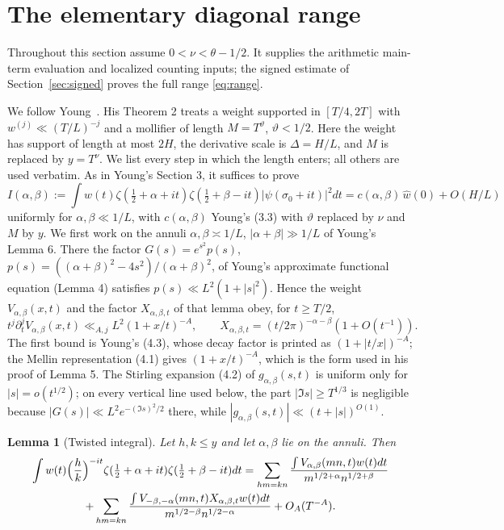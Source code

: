 \documentclass[11pt]{article}
\newtheorem{lemma}[theorem]{Lemma}
\theoremstyle{remark}
\newcommand{\wh}{\widehat w(0)}
\begin{document}
\section{The elementary diagonal range}\label{sec:moment}

Throughout this section assume $0<\nu<\theta-1/2$. It supplies the
arithmetic main-term evaluation and localized counting inputs; the
signed estimate of Section~\ref{sec:signed} proves the full range
\eqref{eq:range}.

We follow Young~\cite{Young}. His Theorem 2 treats a weight supported in
$[T/4,2T]$ with $w^{(j)}\ll(T/L)^{-j}$ and a mollifier of length $M=T^{\vartheta}$,
$\vartheta<1/2$. Here the weight has support of length at most $2H$, the
derivative scale is $\Delta=H/L$, and $M$ is replaced by $y=T^\nu$. We list
every step in which the length enters; all others are used verbatim. As in
Young's Section 3, it suffices to prove
\begin{equation}\label{eq:Iab}
 I(\alpha,\beta):=\int w(t)\zeta(\tfrac12+\alpha+it)\zeta(\tfrac12+\beta-it)
 |\psi(\sigma_0+it)|^2dt=c(\alpha,\beta)\,\wh+O(H/L)
\end{equation}
uniformly for $\alpha,\beta\ll1/L$, with $c(\alpha,\beta)$ Young's (3.3)
with $\vartheta$ replaced by $\nu$ and $M$ by $y$. We first work on the annuli
$\alpha,\beta\asymp1/L$, $|\alpha+\beta|\gg1/L$ of Young's Lemma 6. There the
factor $G(s)=e^{s^2}p(s)$, $p(s)=((\alpha+\beta)^2-4s^2)/(\alpha+\beta)^2$, of
Young's approximate functional equation (Lemma 4) satisfies
$p(s)\ll L^2(1+|s|^2)$. Hence the weight $V_{\alpha,\beta}(x,t)$ and the
factor $X_{\alpha,\beta,t}$ of that lemma obey, for $t\ge T/2$,
\begin{equation}\label{eq:Vbound}
 t^j\partial_t^jV_{\alpha,\beta}(x,t)\ll_{A,j}L^2(1+x/t)^{-A},\qquad
 X_{\alpha,\beta,t}=(t/2\pi)^{-\alpha-\beta}(1+O(t^{-1})).
\end{equation}
The first bound is Young's (4.3), whose decay factor is printed as
$(1+|t/x|)^{-A}$; the Mellin representation (4.1) gives $(1+x/t)^{-A}$,
which is the form used in his proof of Lemma 5. The Stirling expansion (4.2)
of $g_{\alpha,\beta}(s,t)$ is uniform only for $|s|=o(t^{1/2})$; on every
vertical line used below, the part $|\Im s|\ge T^{1/3}$ is negligible because
$|G(s)|\ll L^2e^{-(\Im s)^2/2}$ there, while
$|g_{\alpha,\beta}(s,t)|\ll(t+|s|)^{O(1)}$.

\begin{lemma}[Twisted integral]\label{lem:twisted}
Let $h,k\le y$ and let $\alpha,\beta$ lie on the annuli. Then
\begin{multline*}
 \int w(t)\Bigl(\frac hk\Bigr)^{-it}\zeta(\tfrac12+\alpha+it)\zeta(\tfrac12+\beta-it)dt
 =\sum_{hm=kn}\frac{\int V_{\alpha,\beta}(mn,t)w(t)dt}{m^{1/2+\alpha}n^{1/2+\beta}}\\
 +\sum_{hm=kn}\frac{\int V_{-\beta,-\alpha}(mn,t)X_{\alpha,\beta,t}w(t)dt}{m^{1/2-\beta}n^{1/2-\alpha}}
 +O_A(T^{-A}).
\end{multline*}
\end{lemma}
\end{document}
